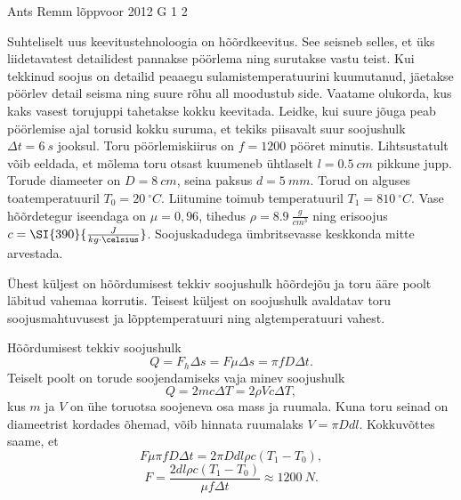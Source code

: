 {Ants Remm} %
{lõppvoor} %
{2012} %
{G 1} %
{2} %
{
\ifStatement
Suhteliselt uus keevitustehnoloogia on hõõrdkeevitus. See seisneb selles, et üks
liidetavatest detailidest pannakse pöörlema ning surutakse vastu teist. Kui
tekkinud soojus on detailid peaaegu sulamistemperatuurini kuumutanud, jäetakse
pöörlev detail seisma ning suure rõhu all moodustub side. Vaatame olukorda, kus
kaks vasest torujuppi tahetakse kokku keevitada. Leidke, kui suure jõuga peab
pöörlemise ajal torusid kokku suruma, et tekiks piisavalt suur soojushulk
$\Delta t = \SI{6}{s}$ jooksul. Toru pöörlemiskiirus on $f = 1200$ pööret
minutis. Lihtsustatult võib eeldada, et mõlema toru otsast kuumeneb ühtlaselt $l
= \SI{0,5}{cm}$ pikkune jupp. Torude diameeter on $D = \SI{8}{cm}$, seina paksus
$d = \SI{5}{mm}$. Torud on alguses toatemperatuuril $T_0 = \SI{20}{^\circ C}$.
Liitumine toimub temperatuuril $T_1 = \SI{810}{^\circ C}$. Vase hõõrdetegur
iseendaga on $\mu = 0,96$, tihedus $\rho = \SI{8,9}{\frac{g}{cm^3}}$ ning
erisoojus $c = \SI{390}{\frac{J}{kg \cdot \celsius}}$. Soojuskadudega ümbritsevasse
keskkonda mitte arvestada.
\fi


\ifHint
Ühest küljest on hõõrdumisest tekkiv soojushulk hõõrdejõu ja toru ääre poolt läbitud vahemaa korrutis. Teisest küljest on soojushulk avaldatav toru soojusmahtuvusest ja lõpptemperatuuri ning algtemperatuuri vahest.
\fi


\ifSolution
Hõõrdumisest tekkiv soojushulk
\[
Q = F_h \Delta s = F \mu \Delta s = \pi f D \Delta t.
\]
Teiselt poolt on torude soojendamiseks vaja minev soojushulk
\[
Q = 2 m c \Delta T = 2 \rho V c \Delta T,
\]
kus $m$ ja $V$ on ühe toruotsa soojeneva osa mass ja ruumala. Kuna toru seinad on diameetrist kordades õhemad, võib hinnata ruumalaks $V = \pi D d l$. Kokkuvõttes saame, et
\[
F \mu \pi f D \Delta t = 2 \pi D d l \rho c ( T_1 - T_0 ),
\]
\[
F = \frac{2 d l \rho c ( T_1 - T_0 )}{ \mu f \Delta t } \approx \SI{1200}{N}.
\]
\fi


}
